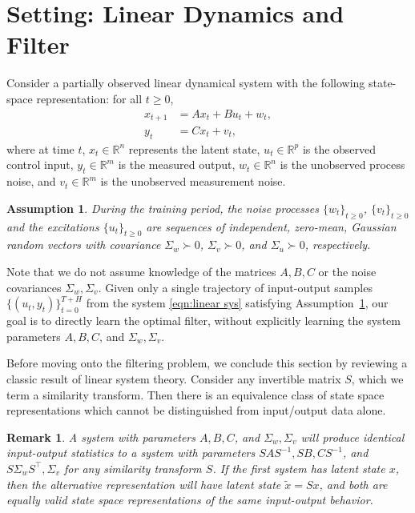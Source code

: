 \documentclass[11pt]{article}
\newtheorem{remark}{Remark}
\newtheorem{assumption}{Assumption}
\newcommand{\R}{\mathbb{R}}				%
\newcommand{\<}{\langle}
\renewcommand{\>}{\rangle}
\numberwithin{equation}{section}
\begin{document}
\section{Setting: Linear Dynamics and Filter}\label{sec:setting}

Consider a partially observed linear dynamical system with the following state-space representation: for all $t \ge 0$, 
\begin{equation}
\begin{aligned}\label{eqn:linear sys}
	x_{t+1} &= A x_t + Bu_t + w_{t},\\
	y_t &= C x_t + v_t,
\end{aligned}
\end{equation}
where at time $t$, $x_t \in \R^n$ represents the latent state, $u_t \in \R^p$ is the observed control input, $y_t \in \R^m$ is the measured output, $w_t \in \R^n$ is the unobserved process noise, and $v_t \in \R^m$ is the unobserved measurement noise. 
\begin{assumption}\label{assump:Gaussian main}
     During the training period, the noise processes $\lbrace w_t \rbrace_{t\ge0}$, $\lbrace v_t \rbrace_{t\ge 0}$ and the excitations $\lbrace u_t \rbrace_{t\ge 0}$ are sequences of independent, zero-mean, Gaussian random vectors with covariance $\Sigma_w \succ 0$, $\Sigma_v \succ 0$, and $\Sigma_u \succ 0$, respectively.
\end{assumption}
Note that we do not assume knowledge of the matrices $A,B, C$ or the noise covariances $\Sigma_w, \Sigma_v$. Given only a single trajectory of input-output samples $\lbrace (u_t, y_t) \rbrace_{t=0}^{T+H}$ from the system \eqref{eqn:linear sys} satisfying Assumption~\ref{assump:Gaussian main}, our goal is to directly learn the optimal filter, without explicitly learning the system parameters $A,B,C$, and $\Sigma_w, \Sigma_v$.  


Before moving onto the filtering problem, we conclude this section by reviewing a classic result of linear system theory.
Consider any invertible matrix $S$, which we term a similarity transform. Then there is an equivalence class of state space representations which cannot be distinguished from input/output data alone.
\begin{remark}
A system with parameters $A,B,C$, and $\Sigma_w, \Sigma_v$ will produce identical input-output statistics to a system with parameters $SAS^{-1}, SB, CS^{-1}$, and $S\Sigma_w S^\top, \Sigma_v$ for any similarity transform $S$. If the first system has latent state $x$, then the alternative representation will have latent state $\tilde x= Sx$, and both are equally valid state space representations of the same input-output behavior.
\end{remark}
\end{document}
